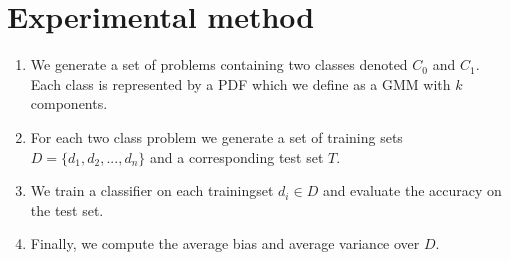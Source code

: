 \documentclass[a4paper]{article}
\begin{document}
\section{Experimental method}
\label{sec:experimental_method}

\begin{enumerate}
\item We generate a set of problems containing two classes denoted $C_0$ and $C_1$. Each class is represented by a \ac{PDF} which we define as a \ac{GMM} with $k$ components.
\item For each two class problem we generate a set of training sets $D = \{d_1, d_2, ..., d_n\}$ and a corresponding test set $T$.
\item We train a classifier on each trainingset $d_i \in D$ and evaluate the accuracy on the test set.
\item Finally, we compute the average bias and average variance over $D$.
\end{enumerate}




\end{document}
